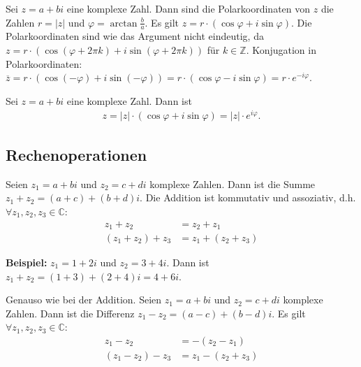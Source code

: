 \documentclass[12pt]{article}
\newcommand{\Z}{\mathbb{Z}}
\newcommand{\C}{\mathbb{C}}
\newenvironment{definition}[2][Definition]{\begin{trivlist}
        \item[\hskip \labelsep {\bfseries #1}\hskip \labelsep {\bfseries #2.}]}{\flushright{$\square$}\end{trivlist}}
\begin{document}
\begin{definition}{[Polarkoordinaten]}
        Sei $z=a+bi$ eine komplexe Zahl. Dann sind die Polarkoordinaten von $z$ die Zahlen $r=|z|$ und $\varphi=\arctan{\frac{b}{a}}$. Es gilt $z=r\cdot(\cos{\varphi}+i\sin{\varphi})$. Die Polarkoordinaten sind wie das Argument nicht eindeutig, da $z=r\cdot(\cos{(\varphi+2\pi k)}+i\sin{(\varphi+2\pi k)})$ für $k\in\Z$. Konjugation in Polarkoordinaten: $\overline{z}=r\cdot(\cos{(-\varphi)}+i\sin{(-\varphi)})=r\cdot(\cos{\varphi}-i\sin{\varphi})=r\cdot e^{-i\varphi}$.
\end{definition}

\begin{definition}{[Euler'sche Formel]}
        Sei $z=a+bi$ eine komplexe Zahl. Dann ist
        \begin{align*}
                z=|z|\cdot(\cos{\varphi}+i\sin{\varphi})=|z|\cdot e^{i\varphi}.
        \end{align*}
\end{definition}

\subsection{Rechenoperationen}

\begin{definition}{[Addition]}
        Seien $z_1=a+bi$ und $z_2=c+di$ komplexe Zahlen. Dann ist die Summe $z_1+z_2=(a+c)+(b+d)i$. Die Addition ist kommutativ und assoziativ, d.h. $\forall z_1,z_2,z_3\in\C$:
        \begin{align*}
                z_1+z_2       & =z_2+z_1       \\
                (z_1+z_2)+z_3 & =z_1+(z_2+z_3)
        \end{align*}

        \textbf{Beispiel:} $z_1=1+2i$ und $z_2=3+4i$. Dann ist $z_1+z_2=(1+3)+(2+4)i=4+6i$.
\end{definition}

\begin{definition}{[Subtraktion]}
        Genauso wie bei der Addition. Seien $z_1=a+bi$ und $z_2=c+di$ komplexe Zahlen. Dann ist die Differenz $z_1-z_2=(a-c)+(b-d)i$. Es gilt $\forall z_1,z_2,z_3\in\C$:
        \begin{align*}
                z_1-z_2       & =-(z_2-z_1)    \\
                (z_1-z_2)-z_3 & =z_1-(z_2+z_3)
        \end{align*}
\end{definition}
\end{document}
